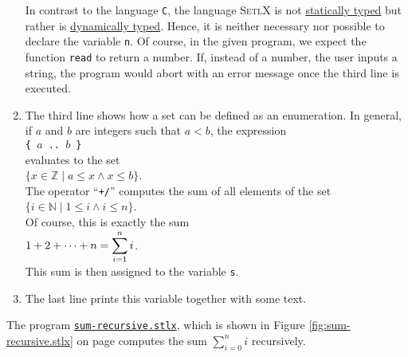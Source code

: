 \begin{enumerate}
      In contrast to the language \texttt{C}, the language \textsc{SetlX} is not
      \href{https://en.wikipedia.org/wiki/Type_system#STATIC}{statically typed} but rather is 
      \href{https://en.wikipedia.org/wiki/Type_system#DYNAMIC}{dynamically typed}.
      Hence, it is neither necessary nor possible to declare the variable \texttt{n}.
      Of course, in the given program, we expect the function \texttt{read} to return a number.
      If, instead of a number, the user inputs a string, the program would abort with an error
      message once the third line is executed.
\item The third line shows how a set can be defined as an enumeration.  In general, if 
      $a$ and $b$ are integers such that  $a < b$, the expression
      \\[0.2cm]
      \hspace*{1.3cm}
      \texttt{\{ $a$ .. $b$ \}}
      \\[0.2cm]
      evaluates to the set 
      \\[0.2cm]
      \hspace*{1.3cm}
      $\{ x \in \mathbb{Z} \mid a \leq x \wedge x \leq b \}$.
      \\[0.2cm]
      The operator ``\texttt{+/}'' computes the sum of all elements of the set
      \\[0.2cm]
      \hspace*{1.3cm}
      $\{ i \in \mathbb{N} \mid 1 \leq i  \wedge i \leq n \}$.
      \\[0.2cm]
      Of course, this is exactly the sum
      \\[0.2cm]
      \hspace*{1.3cm}
      $\displaystyle 1 + 2 + \cdots + n = \sum\limits_{i=1}^n i$.
      \\[0.2cm]
      This sum is then assigned to the variable \texttt{s}.
\item The last line prints this variable together with some text.
\end{enumerate}
The program
\href{https://github.com/karlstroetmann/Logik/blob/master/SetlX/sum-recursive.stlx}{\texttt{sum-recursive.stlx}},
which is shown in Figure \ref{fig:sum-recursive.stlx} on page \pageref{fig:sum-recursive.stlx}
computes the sum $\sum\limits_{i=0}^n i$ recursively.

